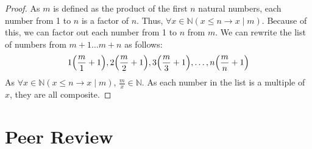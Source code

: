 \documentclass[article, 12pt]{article}
\theoremstyle{definition}
\DeclarePairedDelimiter\paren{(}{)} %
\newcommand{\nats}{\mathbb{N}}
\begin{document}
    \begin{proof}
        As $m$ is defined as the product of the first $n$ natural numbers, each number from 1 to $n$ is a factor of $n$. Thus, $\forall x \in \nats (x \leq n \to x \mid m)$. Because of this, we can factor out each number from 1 to $n$ from $m$. We can rewrite the list of numbers from $m+1 \dots m+n$ as follows:
        \[ 1\paren*{\frac{m}{1}+1}, 2\paren*{\frac{m}{2} + 1}, 3\paren*{\frac{m}{3} + 1}, \dots, n\paren*{\frac{m}{n} + 1} \]
        As $\forall x \in \nats (x \leq n \to x \mid m)$, $\displaystyle\frac{m}{x} \in \nats$. As each number in the list is a multiple of $x$, they are all composite.
    \end{proof}
    \pagebreak
    \section*{Peer Review}
\end{document}
